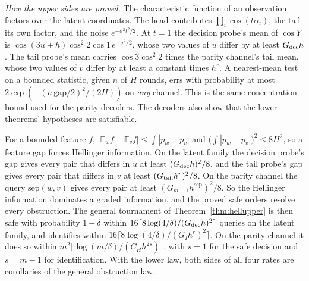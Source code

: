 \emph{How the upper sides are proved.} The characteristic function of an observation factors
over the latent coordinates. The head contributes $\prod_{i}\cos(t\alpha_{i})$, the tail its own
factor, and the noise $e^{-\sigma^{2}t^{2}/2}$. At $t=1$ the decision probe's mean of $\cos Y$ is
$\cos(3u+h)\cos^{2}2\cos1\,e^{-\sigma^{2}/2}$, whose two values of $u$ differ by at least
$G_{\rm dec}h$. The tail probe's mean carries $\cos3\cos^{2}2$ times the parity channel's tail
mean, whose two values of $v$ differ by at least a constant times $h^{r}$. A nearest-mean test on
a bounded statistic, given $n$ of $H$ rounds, errs with probability at most
$2\exp(-(n\,\mathrm{gap}/2)^{2}/(2H))$ on \emph{any} channel. This is the same concentration
bound used for the parity decoders. The decoders
also show that the lower theorems' hypotheses are satisfiable.

\begin{theorem}
\label{thm:tight}
For a bounded feature $f$, $|\mathbb{E}_{w}f-\mathbb{E}_{v}f|\le\int|p_{w}-p_{v}|$ and
$\bigl(\int|p_{w}-p_{v}|\bigr)^{2}\le8H^{2}$, so a feature gap forces Hellinger information. On
the latent family the decision probe's gap gives every pair that differs in $u$ at least
$(G_{\rm dec}h)^{2}/8$, and the tail probe's gap gives every pair that differs in $v$ at least
$(G_{\rm tail}h^{r})^{2}/8$. On the parity channel the query $\mathrm{sep}(w,v)$ gives every pair at
least $(G_{m-1}h^{\mathrm{sep}})^{2}/8$. So the Hellinger information dominates a graded
information, and the proved safe orders resolve every obstruction. The general tournament of
Theorem~\ref{thm:hellupper} is then safe with probability $1-\delta$ within
$16\lceil8\log(4/\delta)/(G_{\rm dec}h)^{2}\rceil$ queries on the latent family, and identifies
within $16\lceil8\log(4/\delta)/(G_{I}h^{r})^{2}\rceil$. On the parity channel it does so within
$m^{2}\lceil\log(m/\delta)/(C_{H}h^{2s})\rceil$, with $s=1$ for the safe decision and $s=m-1$ for
identification. With the lower law, both sides of all four rates are corollaries of the general
obstruction law.
\end{theorem}


